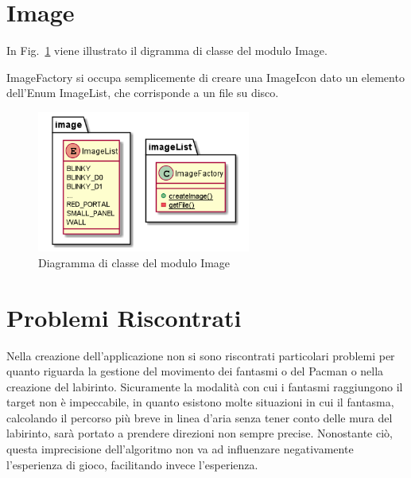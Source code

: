 \documentclass[12pt,a4paper]{report}
\begin{document}

\section{Image}\label{se:arch.image}
In Fig.~\ref{fig:image} viene illustrato il digramma di classe del modulo Image.\newline

ImageFactory si occupa semplicemente di creare una ImageIcon dato un elemento dell’Enum ImageList, che corrisponde a un file su disco.

\begin{figure}[tb]
\begin{center}
  \includegraphics[width=7cm]{image}
\end{center}
  \caption{Diagramma di classe del modulo Image}
  \label{fig:image}
\end{figure}





\section{Problemi Riscontrati}\label{ch:proris}
Nella creazione dell’applicazione non si sono riscontrati particolari problemi per quanto riguarda la gestione del movimento dei fantasmi o del Pacman o nella creazione del labirinto. 
Sicuramente la modalità con cui i fantasmi raggiungono il target non è impeccabile, in quanto esistono molte situazioni in cui il fantasma, calcolando il percorso più breve in linea d’aria senza tener conto delle mura del labirinto, sarà portato a prendere direzioni non sempre precise. Nonostante ciò, questa imprecisione dell’algoritmo non va ad influenzare negativamente l’esperienza di gioco, facilitando invece l’esperienza.
\end{document}
